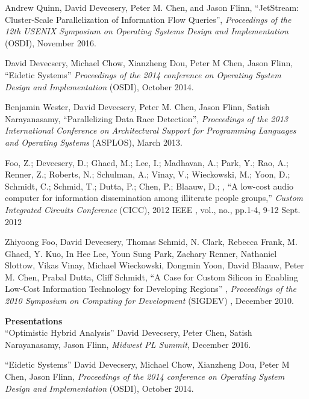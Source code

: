 \documentclass[margin, 10pt]{res} %
\begin{document}
\begin{resume}
Andrew Quinn, David Devecsery, Peter M. Chen, and Jason Flinn,
``JetStream: Cluster-Scale Parallelization of Information Flow
Queries'', {\sl Proceedings of the 12th USENIX Symposium on Operating
Systems Design and Implementation} (OSDI), November 2016.

David Devecsery, Michael Chow, Xianzheng Dou, Peter M Chen, Jason
Flinn, ``Eidetic Systems'' {\sl Proceedings of the 2014 conference on
Operating System Design and Implementation} (OSDI), October 2014.

Benjamin Wester, David Devecsery, Peter M. Chen, Jason Flinn, Satish
Narayanasamy, ``Parallelizing Data Race Detection'', {\sl Proceedings
of the 2013 International Conference on Architectural Support for
Programming Languages and Operating Systems} (ASPLOS), March 2013.

Foo, Z.; Devecsery, D.; Ghaed, M.; Lee, I.; Madhavan, A.; Park, Y.;
Rao, A.; Renner, Z.; Roberts, N.; Schulman, A.; Vinay, V.; Wieckowski,
M.; Yoon, D.; Schmidt, C.; Schmid, T.; Dutta, P.; Chen, P.; Blaauw,
D.; , ``A low-cost audio computer for information dissemination among
illiterate people groups,'' {\sl Custom Integrated Circuits Conference}
(CICC), 2012 IEEE , vol., no., pp.1-4, 9-12 Sept. 2012

%

Zhiyoong Foo, David Devecsery, Thomas Schmid, N. Clark, Rebecca Frank,
M. Ghaed, Y. Kuo, In Hee Lee, Youn Sung Park, Zachary Renner,
Nathaniel Slottow, Vikas Vinay, Michael Wieckowski, Dongmin Yoon,
David Blaauw, Peter M. Chen, Prabal Dutta, Cliff Schmidt, ``A Case for
Custom Silicon in Enabling Low-Cost Information Technology for
Developing Regions'' , {\sl Proceedings of the 2010 Symposium on
Computing for Development} (SIGDEV) , December 2010.

\textbf{Presentations}\\
``Optimistic Hybrid Analysis'' David Devecsery, Peter Chen, Satish
Narayanasamy, Jason Flinn, {\sl Midwest PL Summit}, December 2016.

``Eidetic Systems'' David Devecsery, Michael Chow, Xianzheng Dou,
Peter M Chen, Jason Flinn, {\sl Proceedings of the 2014 conference
on Operating System Design and Implementation} (OSDI), October 2014.


\end{resume}
\end{document}
